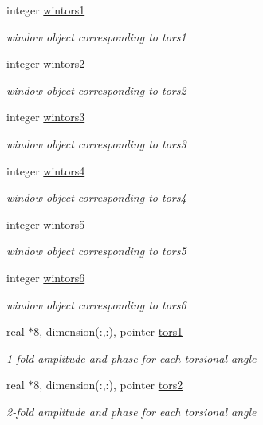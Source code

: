 \begin{DoxyCompactItemize}
integer \hyperlink{classtors_ae73f518b14ddfb4f52d4a837d7cd19b5}{wintors1}
\begin{DoxyCompactList}\small\item\em window object corresponding to tors1 \end{DoxyCompactList}\item 
integer \hyperlink{classtors_afd9aa88d6043185e43f36a3756b88f04}{wintors2}
\begin{DoxyCompactList}\small\item\em window object corresponding to tors2 \end{DoxyCompactList}\item 
integer \hyperlink{classtors_a40da6c430e1053b805d3a5462c800ddb}{wintors3}
\begin{DoxyCompactList}\small\item\em window object corresponding to tors3 \end{DoxyCompactList}\item 
integer \hyperlink{classtors_aab4285963a388f604971379adb71aa94}{wintors4}
\begin{DoxyCompactList}\small\item\em window object corresponding to tors4 \end{DoxyCompactList}\item 
integer \hyperlink{classtors_aa77b9602856958a909ba63c480269d53}{wintors5}
\begin{DoxyCompactList}\small\item\em window object corresponding to tors5 \end{DoxyCompactList}\item 
integer \hyperlink{classtors_a1f3c7a1dc9da4c4ea78cdfc6d72a0e33}{wintors6}
\begin{DoxyCompactList}\small\item\em window object corresponding to tors6 \end{DoxyCompactList}\item 
real $\ast$8, dimension(\-:,\-:), pointer \hyperlink{classtors_a0034d1f878239d3eb1438edde95aec03}{tors1}
\begin{DoxyCompactList}\small\item\em 1-\/fold amplitude and phase for each torsional angle \end{DoxyCompactList}\item 
real $\ast$8, dimension(\-:,\-:), pointer \hyperlink{classtors_a6690f8463e3e2a846d7f58761fc911ad}{tors2}
\begin{DoxyCompactList}\small\item\em 2-\/fold amplitude and phase for each torsional angle \end{DoxyCompactList}\item 

\end{DoxyCompactItemize}
